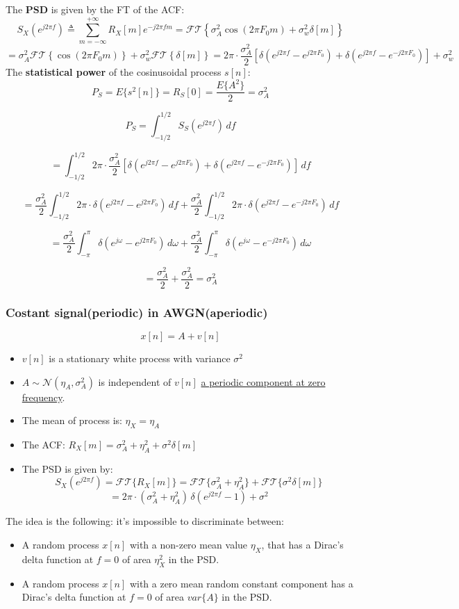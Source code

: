 The \textbf{PSD} is given by the FT of the ACF:
\[
S_X(e^{j2\pi f}) \triangleq \sum_{m=-\infty}^{+\infty} R_X[m] e^{-j2\pi f m}
= \mathcal{FT}\left\{ \sigma_A^2 \cos(2\pi F_0 m) + \sigma_w^2 \delta[m] \right\}
\]
\[
= \sigma_A^2 \mathcal{FT} \left\{ \cos(2\pi F_0 m) \right\} + \sigma_w^2 \mathcal{FT} \left\{ \delta[m] \right\}
= 2\pi \cdot \frac{\sigma_A^2}{2} \left[ \delta\left( e^{j2\pi f} - e^{j2\pi F_0} \right) + \delta\left( e^{j2\pi f} - e^{-j2\pi F_0} \right) \right] + \sigma_w^2
\]
The \textbf{statistical power} of the cosinusoidal process \(s[n]\):
\[
P_S = E\{s^2[n]\} = R_S[0] = \frac{E\{A^2\}}{2} = \sigma_A^2
\]

\[
P_S = \int_{-1/2}^{1/2} S_S(e^{j2\pi f}) \, df
\]

\[
= \int_{-1/2}^{1/2} 2\pi \cdot \frac{\sigma_A^2}{2} 
\left[ \delta \left( e^{j2\pi f} - e^{j2\pi F_0} \right)
+ \delta \left( e^{j2\pi f} - e^{-j2\pi F_0} \right) \right]
\, df
\]

\[
= \frac{\sigma_A^2}{2} \int_{-1/2}^{1/2} 2\pi \cdot \delta(e^{j2\pi f} - e^{j2\pi F_0}) \, df
+ \frac{\sigma_A^2}{2} \int_{-1/2}^{1/2} 2\pi \cdot \delta(e^{j2\pi f} - e^{-j2\pi F_0}) \, df
\]

\[
= \frac{\sigma_A^2}{2} \int_{-\pi}^{\pi} \delta(e^{j\omega} - e^{j2\pi F_0}) \, d\omega
+ \frac{\sigma_A^2}{2} \int_{-\pi}^{\pi} \delta(e^{j\omega} - e^{-j2\pi F_0}) \, d\omega
\]

\[
= \frac{\sigma_A^2}{2} + \frac{\sigma_A^2}{2} = \sigma_A^2
\]
\subsubsection{Costant signal(periodic) in AWGN(aperiodic)}
\[
x[n]=A+v[n]
\]
\begin{itemize}
    \item \(v[n]\) is a stationary white process with variance \(\sigma^2\)
    \item \(A\sim\mathcal{N}(\eta_A,\sigma_A^2)\) is independent of \(v[n]\) \underline{a periodic component at zero frequency}.
    \item The mean of process is: \(\eta_X=\eta_A\)
    \item The ACF: \(R_X[m]=\sigma_A^2+\eta_A^2+\sigma^2\delta[m]\)
    \item The PSD is given by: \[
S_X\left(e^{j2\pi f}\right)
= \mathcal{FT}\{ R_X[m] \}
= \mathcal{FT}\{ \sigma_A^2 + \eta_A^2 \} + \mathcal{FT}\{ \sigma^2 \delta[m] \}
\]
\[
= 2\pi \cdot (\sigma_A^2 + \eta_A^2)\, \delta\left(e^{j2\pi f} - 1\right) + \sigma^2
\]
\end{itemize}
The idea is the following: it's impossible to discriminate between:
\begin{itemize}
    \item A random process \(x[n]\) with a non-zero mean value \(\eta_X\), that has a Dirac's delta function at \(f=0\) of area \(\eta_X^2\) in the PSD.
    \item A random process \(x[n]\) with a zero mean random constant component has a Dirac's delta function at \(f=0\) of area \(var\{A\}\) in the PSD.
\end{itemize}

